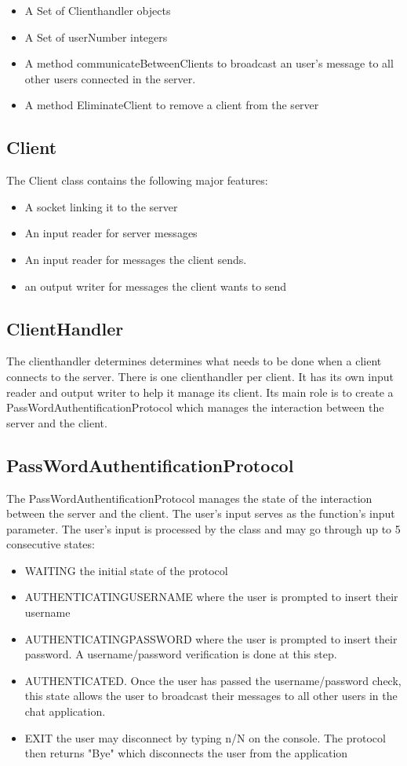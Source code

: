 \documentclass[11pt,letterpaper]{article}
\begin{document}
\begin{itemize}
  \item A Set of Clienthandler objects
  \item A Set of userNumber integers
\item A method communicateBetweenClients to broadcast an user's message to all other users connected in the server.
\item A method EliminateClient to remove a client from the server
\end{itemize}

\subsection{Client}
The Client class contains the following major features:
\begin{itemize}
  \item A socket linking it to the server
  \item An input reader for server messages
  \item An input reader for messages the client sends.
  \item an output writer for messages the client wants to send
\end{itemize}

\subsection{ClientHandler}
The clienthandler determines determines what needs to be done when a client connects to the server. There is one clienthandler per client. It has its own input reader and output writer to help it manage its client. Its main role is to create  a PassWordAuthentificationProtocol which manages  the interaction between the server and the client.


\subsection{PassWordAuthentificationProtocol}
The PassWordAuthentificationProtocol manages the state of the interaction between the server and the client. The user's input serves as the function's input parameter. The user's input is processed by the class and may go through up to 5 consecutive states:

\begin{itemize}
  \item WAITING the initial state of the protocol
  \item AUTHENTICATINGUSERNAME  where the user is prompted to insert their username
  \item AUTHENTICATINGPASSWORD where the user is prompted to insert their password. A username/password verification is done at this step. 
  \item AUTHENTICATED. Once the user has passed the username/password check, this state allows the user to broadcast their messages to all other users in the chat application.
  \item EXIT the user may disconnect by typing n/N on the console. The protocol then returns "Bye" which disconnects the user from the application
\end{itemize}
\end{document}
